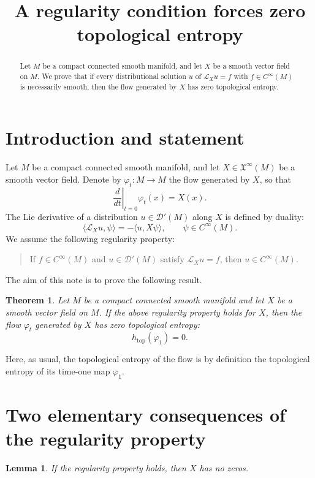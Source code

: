 \documentclass{article}
\title{A regularity condition forces zero topological entropy}
\author{}
\date{}
\newtheorem{theorem}{Theorem}
\newtheorem{lemma}{Lemma}
\theoremstyle{definition}
\newcommand{\cD}{\mathcal{D}}
\newcommand{\cL}{\mathcal{L}}
\begin{document}
\maketitle

\begin{abstract}
Let $M$ be a compact connected smooth manifold, and let $X$ be a smooth
vector field on $M$. We prove that if every distributional solution $u$ of
$\cL_X u=f$ with $f\in C^\infty(M)$ is necessarily smooth, then the flow
generated by $X$ has zero topological entropy.
\end{abstract}

\section{Introduction and statement}

Let $M$ be a compact connected smooth manifold, and let $X\in
\mathfrak{X}^\infty(M)$ be a smooth vector field. Denote by
$\varphi_t:M\to M$ the flow generated by $X$, so that
\[
\left.\frac{d}{dt}\right|_{t=0}\varphi_t(x)=X(x).
\]
The Lie derivative of a distribution $u\in \cD'(M)$ along $X$ is defined by
duality:
\[
\langle \cL_X u,\psi\rangle
=
-\langle u,X\psi\rangle,
\qquad
\psi\in C^\infty(M).
\]
We assume the following regularity property:
\begin{quote}
If $f\in C^\infty(M)$ and $u\in \cD'(M)$ satisfy
$\cL_X u=f$, then $u\in C^\infty(M)$.
\end{quote}

The aim of this note is to prove the following result.

\begin{theorem}\label{thm:main}
Let $M$ be a compact connected smooth manifold and let $X$ be a smooth
vector field on $M$. If the above regularity property holds for $X$, then the
flow $\varphi_t$ generated by $X$ has zero topological entropy:
\[
h_{\mathrm{top}}(\varphi_1)=0.
\]
\end{theorem}

Here, as usual, the topological entropy of the flow is by definition the
topological entropy of its time-one map $\varphi_1$.

\section{Two elementary consequences of the regularity property}

\begin{lemma}\label{lem:no-singularities}
If the regularity property holds, then $X$ has no zeros.
\end{lemma}
\end{document}

